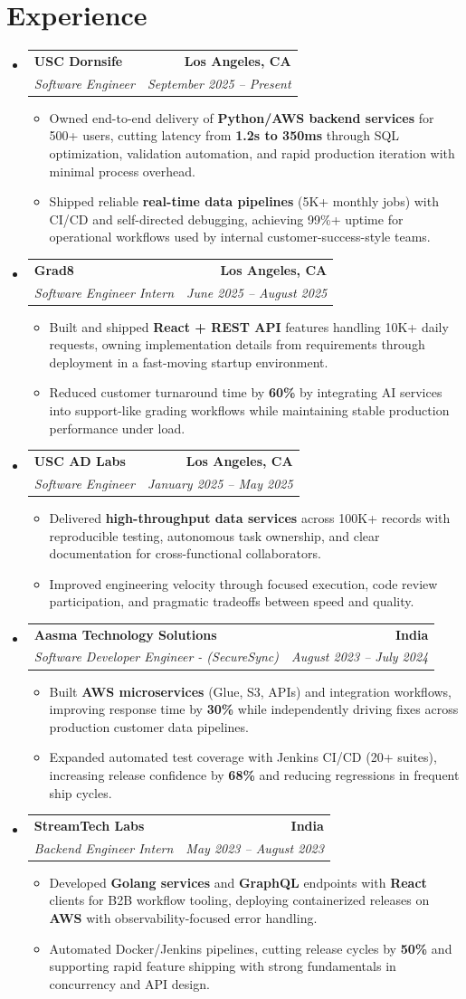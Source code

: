 \documentclass[letterpaper,10pt]{article}
\makeatletter
\newcommand{\resumeItem}[1]{\item\small{{#1 \vspace{-2pt}}}}
\newcommand{\resumeSubheading}[4]{\vspace{-1pt}\item\begin{tabular*}{1.0\textwidth}[t]{l@{\extracolsep{\fill}}r}\textbf{#1} & \textbf{\small #2} \\\textit{\small#3} & \textit{\small #4} \\\end{tabular*}\vspace{-2pt}}
\newcommand{\resumeSubHeadingListStart}{\begin{itemize}[leftmargin=0.0in, label={}]}
\newcommand{\resumeSubHeadingListEnd}{\end{itemize}}
\newcommand{\resumeItemListStart}{\begin{itemize}[leftmargin=0.15in,label=\textbullet,itemsep=2pt,topsep=0pt,parsep=0pt,partopsep=0pt]}
\newcommand{\resumeItemListEnd}{\end{itemize}\vspace{-4pt}}
\makeatother
\begin{document}
\section{Experience}
\resumeSubHeadingListStart
\resumeSubheading{USC Dornsife}{Los Angeles, CA}{Software Engineer}{September 2025 -- Present}
\resumeItemListStart
\resumeItem{Owned end-to-end delivery of \textbf{Python/AWS backend services} for 500+ users, cutting latency from \textbf{1.2s to 350ms} through SQL optimization, validation automation, and rapid production iteration with minimal process overhead.}
\resumeItem{Shipped reliable \textbf{real-time data pipelines} (5K+ monthly jobs) with CI/CD and self-directed debugging, achieving 99\%+ uptime for operational workflows used by internal customer-success-style teams.}
\resumeItemListEnd
\resumeSubheading{Grad8}{Los Angeles, CA}{Software Engineer Intern}{June 2025 -- August 2025}
\resumeItemListStart
\resumeItem{Built and shipped \textbf{React + REST API} features handling 10K+ daily requests, owning implementation details from requirements through deployment in a fast-moving startup environment.}
\resumeItem{Reduced customer turnaround time by \textbf{60\%} by integrating AI services into support-like grading workflows while maintaining stable production performance under load.}
\resumeItemListEnd
\resumeSubheading{USC AD Labs}{Los Angeles, CA}{Software Engineer}{January 2025 -- May 2025}
\resumeItemListStart
\resumeItem{Delivered \textbf{high-throughput data services} across 100K+ records with reproducible testing, autonomous task ownership, and clear documentation for cross-functional collaborators.}
\resumeItem{Improved engineering velocity through focused execution, code review participation, and pragmatic tradeoffs between speed and quality.}
\resumeItemListEnd
\resumeSubheading{Aasma Technology Solutions}{India}{Software Developer Engineer - (SecureSync)}{August 2023 -- July 2024}
\resumeItemListStart
\resumeItem{Built \textbf{AWS microservices} (Glue, S3, APIs) and integration workflows, improving response time by \textbf{30\%} while independently driving fixes across production customer data pipelines.}
\resumeItem{Expanded automated test coverage with Jenkins CI/CD (20+ suites), increasing release confidence by \textbf{68\%} and reducing regressions in frequent ship cycles.}
\resumeItemListEnd
\resumeSubheading{StreamTech Labs}{India}{Backend Engineer Intern}{May 2023 -- August 2023}
\resumeItemListStart
\resumeItem{Developed \textbf{Golang services} and \textbf{GraphQL} endpoints with \textbf{React} clients for B2B workflow tooling, deploying containerized releases on \textbf{AWS} with observability-focused error handling.}
\resumeItem{Automated Docker/Jenkins pipelines, cutting release cycles by \textbf{50\%} and supporting rapid feature shipping with strong fundamentals in concurrency and API design.}
\resumeItemListEnd
\resumeSubHeadingListEnd
\vspace{-14pt}
\end{document}
